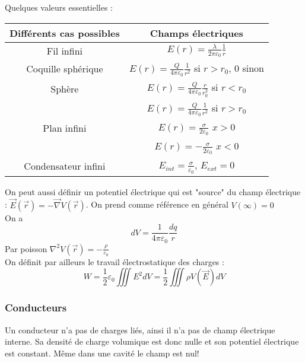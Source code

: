\documentclass[../main.tex]{subfiles}
\begin{document}
Quelques valeurs essentielles :\\
\begin{table}[hbt!]
    \centering
    \begin{tabular}{c|c}
        Différents cas possibles & Champs électriques \\
        \hline
        Fil infini & $E(r) = \frac{\lambda}{2\pi \varepsilon_0} \frac{1}{r}$\\
        \hline
        Coquille sphérique & $E(r) = \frac{Q}{4\pi \varepsilon_0} \frac{1}{r^2}$ si $r> r_0$, 0 sinon\\
        \hline
        Sphère & $E(r) = \frac{Q}{4\pi \varepsilon_0} \frac{r}{r_0^3}$ si $r<r_0$\\
         & $E(r) = \frac{Q}{4\pi \varepsilon_0}\frac{1}{r^2}$ si $r> r_0$\\
         \hline
         Plan infini & $E(r) = \frac{\sigma}{2\varepsilon_0}$ $x>0$\\
          & $E(r) = -\frac{\sigma}{2\varepsilon_0}$ $x<0$\\
          \hline
          Condensateur infini & $E_{int} = \frac{\sigma}{\varepsilon_0}$, $E_{ext} = 0$\\
    \end{tabular}
\end{table}


On peut aussi définir un potentiel électrique qui est "source" du champ électrique : $\vec{E}(\vec{r}) = -\vec{\nabla} V(\vec{r})$. On prend comme référence en général $V(\infty) = 0$\\
On a \\
\begin{equation}
    dV = \frac{1}{4\pi \varepsilon_0} \frac{dq}{r}
\end{equation}
Par poisson $\nabla^2 V(\vec{r}) = -\frac{\rho}{\varepsilon_0}$\\

On définit par ailleurs le travail électrostatique des charges :\\
\begin{equation}
    W = \frac{1}{2}\varepsilon_0 \iiint E^2dV = \frac{1}{2} \iiint \rho V(\vec{E}) dV
\end{equation}
\subsubsection{Conducteurs}
Un conducteur n'a pas de charges liés, ainsi il n'a pas de champ électrique interne. Sa densité de charge volumique est donc nulle et son potentiel électrique est constant. Même dans une cavité le champ est nul!\\
\end{document}
